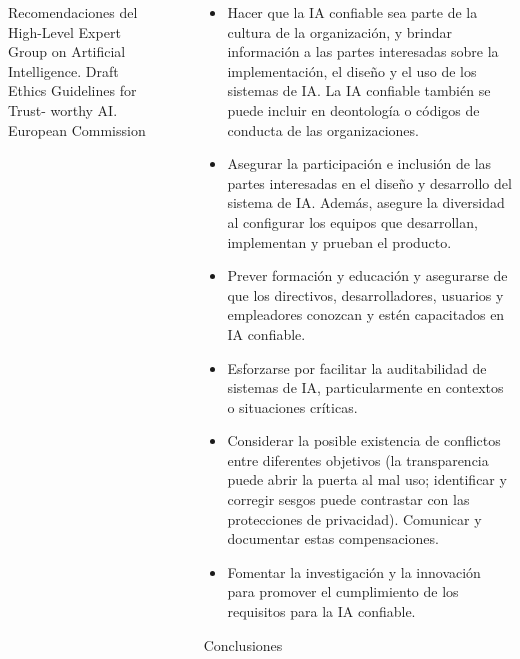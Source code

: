 \documentclass[final]{beamer}
\newlength{\sepwidth}
\newlength{\colwidth}
\newcommand{\separatorcolumn}{\begin{column}{\sepwidth}\end{column}}
\begin{document}
\begin{frame}[t]
\begin{columns}[t]
\begin{column}{\colwidth}
\begin{exampleblock}{Recomendaciones del High-Level Expert Group on Artiﬁcial Intelligence. Draft Ethics Guidelines for Trust- worthy AI. European Commission\cite{avila-tomas_inteligencia_2021}}
\begin{itemize}
  
    
\end{itemize}
  
  \end{exampleblock}

\end{column}

\separatorcolumn

\begin{column}{\colwidth}

  \begin{exampleblock}{}

   \begin{itemize}
     \item Hacer que la IA conﬁable sea parte de la cultura de la organización, y brindar información a las partes interesadas sobre la implementación, el diseño y el uso de los sistemas de IA. La IA conﬁable también se puede incluir en deontología o códigos de conducta de las organizaciones.
    \item Asegurar la participación e inclusión de las partes interesadas en el diseño y desarrollo del sistema de IA. Además, asegure la diversidad al conﬁgurar los equipos que desarrollan, implementan y prueban el producto.
    \item Prever formación y educación y asegurarse de que los directivos, desarrolladores, usuarios y empleadores conozcan y estén capacitados en IA conﬁable.
    \item Esforzarse por facilitar la auditabilidad de sistemas de IA, particularmente en contextos o situaciones críticas.
    \item Considerar la posible existencia de conﬂictos entre             diferentes objetivos (la transparencia puede abrir la puerta al mal uso; identiﬁcar y corregir sesgos puede   contrastar con las protecciones de privacidad). Comunicar y documentar estas compensaciones.
    \item Fomentar la investigación y la innovación para promover el cumplimiento de los requisitos para la IA   conﬁable.
   \end{itemize}

  \end{exampleblock}

  \begin{block}{Conclusiones}
	


\end{block}
\end{column}
\end{columns}
\end{frame}
\end{document}
